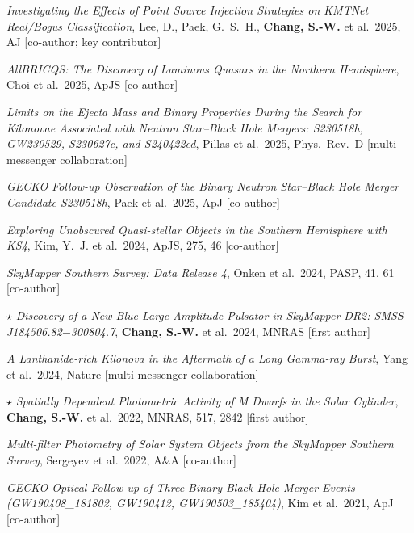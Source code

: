 \documentclass[letterpaper,11pt]{article}
\begin{document}
{\begin{etaremune}
\item \emph{Investigating the Effects of Point Source Injection Strategies on
KMTNet Real/Bogus Classification}, Lee, D., Paek, G.~S.~H., \textbf{Chang, S.-W.} et al.\
2025, AJ [co-author; key contributor] 

\item \emph{AllBRICQS: The Discovery of Luminous Quasars in the Northern Hemisphere},
Choi et al.\ 2025, ApJS [co-author]

\item \emph{Limits on the Ejecta Mass and Binary Properties During the Search for Kilonovae
Associated with Neutron Star--Black Hole Mergers: S230518h, GW230529, S230627c, and
S240422ed}, Pillas et al.\ 2025, Phys.\ Rev.\ D [multi-messenger collaboration]

\item \emph{GECKO Follow-up Observation of the Binary Neutron Star--Black Hole Merger
Candidate S230518h}, Paek et al.\ 2025, ApJ [co-author]

\item \emph{Exploring Unobscured Quasi-stellar Objects in the Southern Hemisphere with
KS4}, Kim, Y.~J. et al.\ 2024, ApJS, 275, 46 [co-author]

\item \emph{SkyMapper Southern Survey: Data Release 4}, Onken et al.\ 2024, PASP, 41, 61
[co-author]

\item $\star$ \emph{Discovery of a New Blue Large-Amplitude Pulsator in SkyMapper DR2:
SMSS J184506.82$-$300804.7}, \textbf{Chang, S.-W.} et al.\ 2024, MNRAS
[first author] 

\item \emph{A Lanthanide-rich Kilonova in the Aftermath of a Long Gamma-ray Burst},
Yang et al.\ 2024, Nature [multi-messenger collaboration] 

\item $\star$ \emph{Spatially Dependent Photometric Activity of M Dwarfs in the Solar
Cylinder}, \textbf{Chang, S.-W.} et al.\ 2022, MNRAS, 517, 2842 [first author]

\item \emph{Multi-filter Photometry of Solar System Objects from the SkyMapper Southern
Survey}, Sergeyev et al.\ 2022, A\&A [co-author] 

\item \emph{GECKO Optical Follow-up of Three Binary Black Hole Merger Events
(GW190408\_181802, GW190412, GW190503\_185404)}, Kim et al.\ 2021, ApJ [co-author]


\end{etaremune}}
\end{document}
